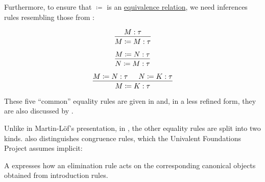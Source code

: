 \begin{remark}
\begin{thmenum}
    Furthermore, to ensure that \( {\coloneqq} \) is an \hyperref[def:equivalence_relation]{equivalence relation}, we need inferences rules resembling those from :
    \begin{paracol}{3}
      \begin{nthcolumn}{0}
        \ParacolAlignmentHack
        \begin{equation*}
          \begin{prooftree}
            \hypo{ M: \tau }
            \infer1{ M \coloneqq M: \tau }
          \end{prooftree}
        \end{equation*}
      \end{nthcolumn}

      \begin{nthcolumn}{1}
        \ParacolAlignmentHack
        \begin{equation*}
          \begin{prooftree}
            \hypo{ M \coloneqq N: \tau }
            \infer1{ N \coloneqq M: \tau }
          \end{prooftree}
        \end{equation*}
      \end{nthcolumn}

      \begin{nthcolumn}{2}
        \ParacolAlignmentHack
        \begin{equation*}
          \begin{prooftree}
            \hypo{ M \coloneqq N: \tau }
            \hypo{ N \coloneqq K: \tau }
            \infer2{ M \coloneqq K: \tau }
          \end{prooftree}
        \end{equation*}
      \end{nthcolumn}
    \end{paracol}
    \columnratio{}

    These five \enquote{common} equality rules are given in \cite[433]{UnivalentProject2024OctoberHoTT} and, in a less refined form, they are also discussed by .

    Unlike in Martin-L\"of's presentation, in \cite[27]{UnivalentProject2024OctoberHoTT}, the other equality rules are split into two kinds.  also distinguishes congruence rules, which the Univalent Foundations Project assumes implicit:
    \begin{thmenum}
       A  expresses how an elimination rule acts on the corresponding canonical objects obtained from introduction rules.


\end{thmenum}
\end{thmenum}
\end{remark}
